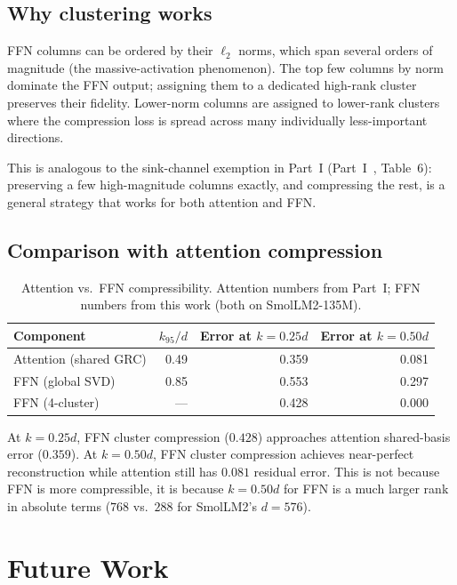\documentclass[11pt]{article}
\begin{document}
\subsection{Why clustering works}

FFN columns can be ordered by their $\ell_2$ norms, which span several
orders of magnitude (the massive-activation phenomenon).  The top few
columns by norm dominate the FFN output; assigning them to a dedicated
high-rank cluster preserves their fidelity.  Lower-norm columns are
assigned to lower-rank clusters where the compression loss is spread
across many individually less-important directions.

This is analogous to the sink-channel exemption in Part~I
(Part~I~\cite{stewart2026grc}, Table~6): preserving a few high-magnitude columns
exactly, and compressing the rest, is a general strategy that works
for both attention and FFN.

\subsection{Comparison with attention compression}

\begin{table}[h]\centering\small
\caption{Attention vs.\ FFN compressibility.  Attention numbers from
Part~I; FFN numbers from this work (both on SmolLM2-135M).}
\label{tab:attn-vs-ffn}
\begin{tabular}{@{}lrrr@{}}
\toprule
Component & $k_{95}/d$ & Error at $k{=}0.25d$ & Error at $k{=}0.50d$ \\
\midrule
Attention (shared GRC)  & 0.49 & 0.359 & 0.081 \\
FFN (global SVD)        & 0.85 & 0.553 & 0.297 \\
FFN (4-cluster)         & ---  & 0.428 & 0.000 \\
\bottomrule
\end{tabular}
\end{table}

At $k{=}0.25d$, FFN cluster compression ($0.428$) approaches attention
shared-basis error ($0.359$).  At $k{=}0.50d$, FFN cluster compression
achieves near-perfect reconstruction while attention still has $0.081$
residual error.  This is not because FFN is more compressible, it is
because $k{=}0.50d$ for FFN is a much larger rank in absolute terms
($768$ vs.\ $288$ for SmolLM2's $d{=}576$).

\section{Future Work}
\label{sec:future}
\end{document}
